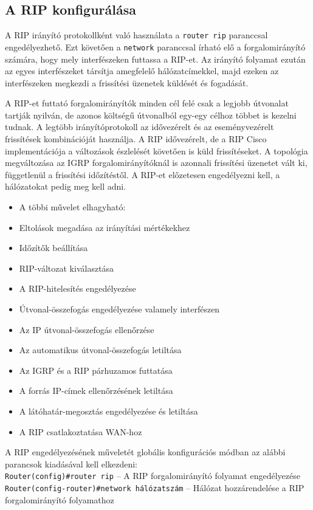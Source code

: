 \subsection{A RIP konfigurálása}
A RIP irányító protokollként való használata a \verb|router rip| paranccsal engedélyezhető. Ezt követően a \verb|network| paranccsal írható elő a forgalomirányító számára, hogy mely  interfészeken futtassa a RIP-et. Az irányító folyamat ezután az egyes interfészeket társítja amegfelelő hálózatcímekkel, majd ezeken az interfészeken megkezdi a frissítési üzenetek küldését és fogadását.

A RIP-et futtató forgalomirányítók minden cél felé csak a legjobb útvonalat tartják nyilván, de azonos költségű útvonalból egy-egy célhoz többet is kezelni tudnak. A legtöbb irányítóprotokoll az idővezérelt és az eseményvezérelt frissítések kombinációját használja. A RIP idővezérelt, de a RIP Cisco implementációja a változások észlelését követően is küld frissítéseket. A topológia megváltozása az IGRP forgalomirányítóknál is azonnali frissítési üzenetet vált ki, függetlenül a frissítési időzítéstől. A RIP-et előzetesen engedélyezni kell, a hálózatokat pedig meg kell adni.
\begin{itemize}[nosep]
	\item A többi művelet elhagyható:
	\item Eltolások megadása az irányítási mértékekhez
	\item Időzítők beállítása
	\item RIP-változat kiválasztása
	\item A RIP-hitelesítés engedélyezése
	\item Útvonal-összefogás engedélyezése valamely interfészen
	\item Az IP útvonal-összefogás ellenőrzése
	\item Az automatikus útvonal-összefogás letiltása
	\item Az IGRP és a RIP párhuzamos futtatása
	\item A forrás IP-címek ellenőrzésének letiltása
	\item A látóhatár-megosztás engedélyezése és letiltása
	\item A RIP csatlakoztatása WAN-hoz
\end{itemize}
A RIP engedélyezésének műveletét globális konfigurációs módban az alábbi parancsok kiadásával kell elkezdeni:\\
\verb|Router(config)#router rip| -- A RIP forgalomirányító folyamat engedélyezése\\
\verb|Router(config-router)#network hálózatszám| -- Hálózat hozzárendelése a RIP forgalomirányító folyamathoz

